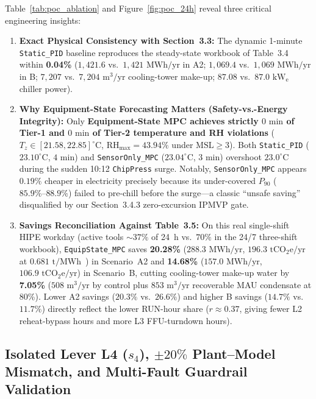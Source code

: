 Table~\ref{tab:poc_ablation} and Figure~\ref{fig:poc_24h} reveal three critical engineering insights:
\begin{enumerate}
    \item \textbf{Exact Physical Consistency with Section~3.3:} The dynamic 1-minute \texttt{Static\_PID} baseline reproduces the steady-state workbook of Table~3.4 within \textbf{0.04\%} ($1{,}421.6$ vs.\ $1{,}421\text{ MWh/yr}$ in A2; $1{,}069.4$ vs.\ $1{,}069\text{ MWh/yr}$ in B; $7{,}207$ vs.\ $7{,}204\text{ m}^3/\text{yr}$ cooling-tower make-up; $87.08$ vs.\ $87.0\text{ kW}_\text{e}$ chiller power).
    \item \textbf{Why Equipment-State Forecasting Matters (Safety-vs.-Energy Integrity):} Only \textbf{Equipment-State MPC achieves strictly $0\text{ min}$ of Tier-1 and $0\text{ min}$ of Tier-2 temperature and RH violations} ($T_z \in [21.58, 22.85]^\circ\text{C}$, $\text{RH}_{\max} = 43.94\%$ under $\text{MSL} \ge 3$). Both \texttt{Static\_PID} ($23.10^\circ\text{C}$, $4\text{ min}$) and \texttt{SensorOnly\_MPC} ($23.04^\circ\text{C}$, $3\text{ min}$) overshoot $23.0^\circ\text{C}$ during the sudden 10:12 \texttt{ChipPress} surge. Notably, \texttt{SensorOnly\_MPC} appears $0.19\%$ cheaper in electricity precisely because its under-covered $P_{90}$ ($85.9\%\text{--}88.9\%$) failed to pre-chill before the surge---a classic ``unsafe saving'' disqualified by our Section~3.4.3 zero-excursion IPMVP gate.
    \item \textbf{Savings Reconciliation Against Table~3.5:} On this real single-shift HIPE workday (active tools $\sim 37\%$ of 24~h vs.\ $70\%$ in the 24/7 three-shift workbook), \texttt{EquipState\_MPC} saves \textbf{20.28\%} ($288.3\text{ MWh/yr}$, $196.3\text{ tCO}_2\text{e/yr}$ at $0.681\text{ t/MWh}$~\cite{grid2025}) in Scenario~A2 and \textbf{14.68\%} ($157.0\text{ MWh/yr}$, $106.9\text{ tCO}_2\text{e/yr}$) in Scenario~B, cutting cooling-tower make-up water by \textbf{7.05\%} ($508\text{ m}^3/\text{yr}$ by control plus $853\text{ m}^3/\text{yr}$ recoverable MAU condensate at 80\%). Lower A2 savings ($20.3\%$ vs.\ $26.6\%$) and higher B savings ($14.7\%$ vs.\ $11.7\%$) directly reflect the lower RUN-hour share ($r \approx 0.37$, giving fewer L2 reheat-bypass hours and more L3 FFU-turndown hours).
\end{enumerate}

\subsection{Isolated Lever L4 ($s_4$), $\pm 20\%$ Plant--Model Mismatch, and Multi-Fault Guardrail Validation}


